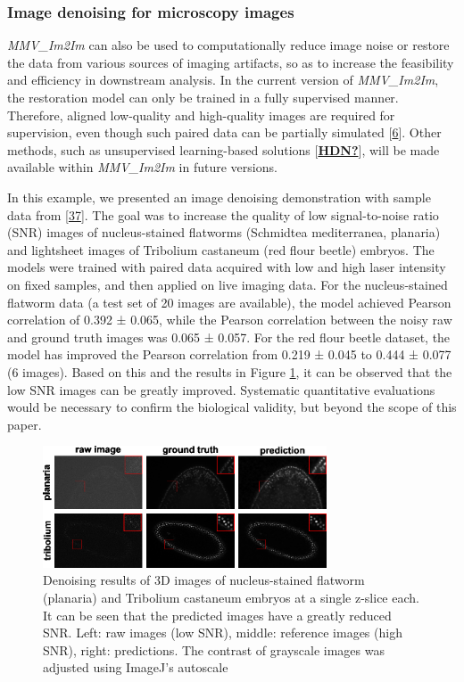 \hypertarget{image-denoising-for-microscopy-images}{%
\subsubsection{Image denoising for microscopy images}\label{image-denoising-for-microscopy-images}}

\emph{MMV\_Im2Im} can also be used to computationally reduce image noise or restore the data from various sources of imaging artifacts, so as to increase the feasibility and efficiency in downstream analysis. In the current version of \emph{MMV\_Im2Im}, the restoration model can only be trained in a fully supervised manner. Therefore, aligned low-quality and high-quality images are required for supervision, even though such paired data can be partially simulated {[}\protect\hyperlink{ref-wcCVn8av}{6}{]}. Other methods, such as unsupervised learning-based solutions {[}\protect\hyperlink{ref-HDN}{\textbf{HDN?}}{]}, will be made available within \emph{MMV\_Im2Im} in future versions.

In this example, we presented an image denoising demonstration with sample data from {[}\protect\hyperlink{ref-12G712Zky}{37}{]}. The goal was to increase the quality of low signal-to-noise ratio (SNR) images of nucleus-stained flatworms (Schmidtea mediterranea, planaria) and lightsheet images of Tribolium castaneum (red flour beetle) embryos. The models were trained with paired data acquired with low and high laser intensity on fixed samples, and then applied on live imaging data. For the nucleus-stained flatworm data (a test set of 20 images are available), the model achieved Pearson correlation of 0.392 ± 0.065, while the Pearson correlation between the noisy raw and ground truth images was 0.065 ± 0.057. For the red flour beetle dataset, the model has improved the Pearson correlation from 0.219 ± 0.045 to 0.444 ± 0.077 (6 images). Based on this and the results in Figure \ref{fig:denoising}, it can be observed that the low SNR images can be greatly improved. Systematic quantitative evaluations would be necessary to confirm the biological validity, but beyond the scope of this paper.

\begin{figure}
\hypertarget{fig:denoising}{%
\centering
\includegraphics[width=0.75\textwidth,height=\textheight]{images/denoising_justin.png}
\caption{Denoising results of 3D images of nucleus-stained flatworm (planaria) and Tribolium castaneum embryos at a single z-slice each. It can be seen that the predicted images have a greatly reduced SNR. Left: raw images (low SNR), middle: reference images (high SNR), right: predictions. The contrast of grayscale images was adjusted using ImageJ's autoscale}\label{fig:denoising}
}
\end{figure}

